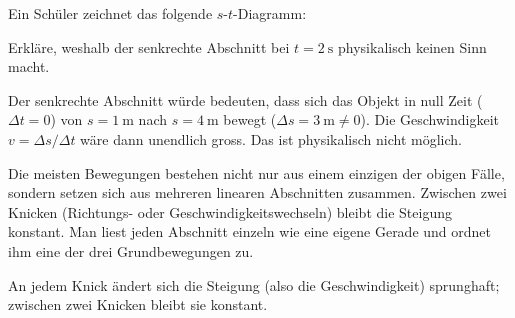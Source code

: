 \begin{questions}
\begin{taskbox}
\question[3] Ein Schüler zeichnet das folgende $s$-$t$-Diagramm:

\begin{center}
\end{center}

Erkläre, weshalb der senkrechte Abschnitt bei $t=\SI{2}{\second}$
physikalisch keinen Sinn macht.

\begin{solution}
Der senkrechte Abschnitt würde bedeuten, dass sich das Objekt in null Zeit
($\Delta t=0$) von $s=\SI{1}{\meter}$ nach $s=\SI{4}{\meter}$ bewegt
($\Delta s=\SI{3}{\meter}\neq 0$). Die Geschwindigkeit $v=\Delta s/\Delta t$
wäre dann unendlich gross. Das ist physikalisch nicht möglich.
\end{solution}
\end{taskbox}
\end{questions}

\begin{theoriebox}
Die meisten Bewegungen bestehen nicht nur aus einem einzigen der obigen
Fälle, sondern setzen sich aus mehreren linearen Abschnitten zusammen.
Zwischen zwei Knicken (Richtungs- oder Geschwindigkeitswechseln) bleibt
die Steigung konstant. Man liest jeden Abschnitt einzeln wie eine
eigene Gerade und ordnet ihm eine der drei Grundbewegungen zu.

\begin{center}
\end{center}

An jedem Knick ändert sich die Steigung (also die Geschwindigkeit)
sprunghaft; zwischen zwei Knicken bleibt sie konstant.
\end{theoriebox}

